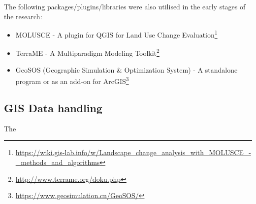 The following packages/plugins/libraries were also utilised in the early stages of the research:
\begin{itemize}
\item MOLUSCE - A plugin for QGIS for Land Use Change Evaluation\footnote{\url{https://wiki.gis-lab.info/w/Landscape_change_analysis_with_MOLUSCE_-_methods_and_algorithms}}
\item TerraME - A Multiparadigm Modeling Toolkit\footnote{\url{http://www.terrame.org/doku.php}}
\item GeoSOS (Geographic Simulation \& Optimization System) - A standalone program or as an add-on for ArcGIS\footnote{\url{https://www.geosimulation.cn/GeoSOS/}}
\end{itemize}
\subsection{GIS Data handling}
The 